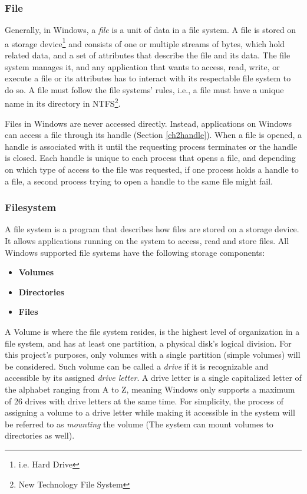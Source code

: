 \subsubsection{File}
\label{file}
Generally, in Windows, a \textit{file} is a unit of data in a file system. A file is stored on a storage device\footnote{i.e. Hard Drive} and consists of one or multiple streams of bytes, which hold related data, and a set of attributes that describe the file and its data. The file system manages it, and any application that wants to access, read, write, or execute a file or its attributes has to interact with its respectable file system to do so. A file must follow the file systems' rules, i.e., a file must have a unique name in its directory in NTFS\footnote{New Technology File System}.\cite{FilesAndClusters}

Files in Windows are never accessed directly. Instead, applications on Windows can access a file through its handle (Section \ref{ch2handle}). When a file is opened, a handle is associated with it until the requesting process terminates or the handle is closed. Each handle is unique to each process that opens a file, and depending on which type of access to the file was requested, if one process holds a handle to a file, a second process trying to open a handle to the same file might fail.\cite{FileHandles}

\subsubsection{Filesystem}
A file system is a program that describes how files are stored on a storage device. It allows applications running on the system to access, read and store files. All Windows supported file systems have the following storage components:\cite{LocalFileSystems}

\begin{itemize}
    \item \textbf{Volumes}
    \item \textbf{Directories}
    \item \textbf{Files}
\end{itemize}

A Volume is where the file system resides, is the highest level of organization in a file system, and has at least one partition, a physical disk's logical division.\cite{WinVolumeMgmt} For this project's purposes, only volumes with a single partition (simple volumes) will be considered. Such volume can be called a \textit{drive} if it is recognizable and accessible by its assigned \textit{drive letter}. 
A drive letter is a single capitalized letter of the alphabet ranging from A to Z, meaning Windows only supports a maximum of 26 drives with drive letters at the same time. For simplicity, the process of assigning a volume to a drive letter while making it accessible in the system will be referred to as \textit{mounting} the volume (The system can mount volumes to directories as well).

